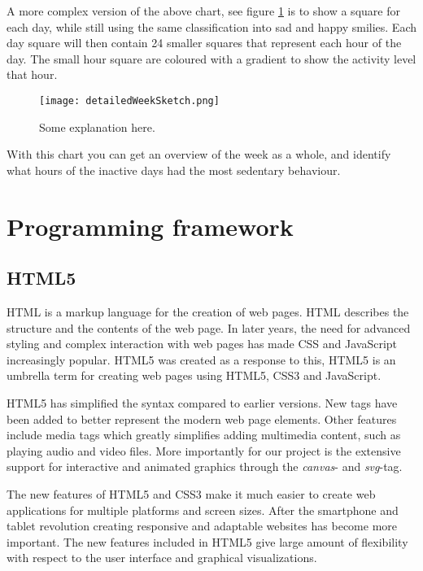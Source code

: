 A more complex version of the above chart, see figure \ref{fig:detailedWeek} is to show a square for each day, while still using the same classification into sad and happy smilies. Each day square will then contain 24 smaller squares that represent each hour of the day. The small hour square are coloured with a gradient to show the activity level that hour.

\begin{figure}[h!]
	\centering
		\texttt{[image: detailedWeekSketch.png]}
		\caption{\footnotesize Some explanation here.}
		\label{fig:detailedWeek}
\end{figure}

With this chart you can get an overview of the week as a whole, and identify what hours of the inactive days had the most sedentary behaviour. 


\section{Programming framework}
\subsection{HTML5}
HTML is a markup language for the creation of web pages. HTML describes the structure and the contents of the web page. In later years, the need for advanced styling and complex interaction with web pages has made CSS and JavaScript increasingly popular. HTML5 was created as a response to this, HTML5 is an umbrella term for creating web pages using HTML5, CSS3 and JavaScript.

HTML5 has simplified the syntax compared to earlier versions. New tags have been added to better represent the modern web page elements. Other features include media tags which greatly simplifies adding multimedia content, such as playing audio and video files. More importantly for our project is the extensive support for interactive and animated graphics through the \emph{canvas}- and \emph{svg}-tag.

The new features of HTML5 and CSS3 make it much easier to create web applications for multiple platforms and screen sizes. After the smartphone and tablet revolution creating responsive and adaptable websites has become more important. The new features included in HTML5 give large amount of flexibility with respect to the user interface and graphical visualizations.


